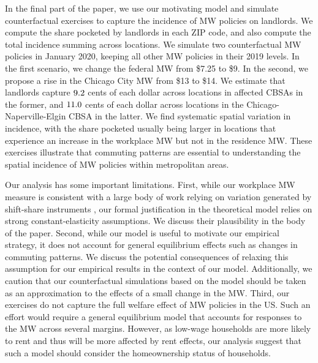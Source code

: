 In the final part of the paper, we use our motivating model and simulate 
counterfactual exercises to capture the incidence of MW policies on landlords.
We compute the share pocketed by landlords in each ZIP code, and also
compute the total incidence summing across locations.
We simulate two counterfactual MW policies in January 2020, keeping all other
MW policies in their 2019 levels.
In the first scenario, we change the federal MW from \$7.25 to \$9.
In the second, we propose a rise in the Chicago City MW from \$13 to \$14.
We estimate that landlords capture $\textnormal{9.2}$ cents of each 
dollar across locations in affected CBSAs in the former, and 
$\textnormal{11.0}$ cents of each dollar across locations in the 
Chicago-Naperville-Elgin CBSA in the latter.
We find systematic spatial variation in incidence,
with the share pocketed usually being larger in locations that experience an
increase in the workplace MW but not in the residence MW.
These exercises illustrate that commuting patterns are essential to 
understanding the spatial incidence of MW policies within metropolitan areas.


Our analysis has some important limitations.
First, while our workplace MW measure is consistent with a large
body of work relying on variation generated by shift-share instruments 
\parencite[e.g., see recent work by][]{GoldsmithpinkhamEtAl2020,
BorusyakHullJaravel2021}, our formal justification in the theoretical model 
relies on strong constant-elasticity assumptions.
We discuss their plausibility in the body of the paper.
Second, while our model is useful to motivate our empirical strategy, it does 
not account for general equilibrium effects such as changes in commuting 
patterns.
We discuss the potential consequences of relaxing this assumption for our 
empirical results in the context of our model.
Additionally, we caution that our counterfactual simulations based on the model 
should be taken as an approximation to the effects of a small change in the MW.
Third, our exercises do not capture the full welfare effect of MW policies
in the US.
Such an effort would require a general equilibrium model that accounts for 
responses to the MW across several margins.
However, as low-wage households are more likely to rent and thus will be more 
affected by rent effects, our analysis suggest that such a model should 
consider the homeownership status of households.


